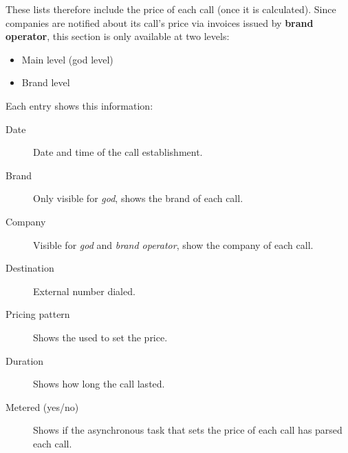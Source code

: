 \documentclass[letterpaper,10pt,english]{sphinxmanual}
\begin{document}
These lists therefore include the price of each call (once it is calculated). Since
companies are notified about its call's price via invoices issued by \textbf{brand operator},
this section is only available at two levels:
\begin{itemize}
\item {} 
Main level (god level)

\item {} 
Brand level

\end{itemize}

Each entry shows this information:
\begin{description}
\item[{Date}] \leavevmode{}\label{billing_and_invoices/billable_calls:term-date}
Date and time of the call establishment.

\item[{Brand}] \leavevmode{}\label{billing_and_invoices/billable_calls:term-brand}
Only visible for \emph{god}, shows the brand of each call.

\item[{Company}] \leavevmode{}\label{billing_and_invoices/billable_calls:term-company}
Visible for \emph{god} and \emph{brand operator}, show the company of each call.

\item[{Destination}] \leavevmode{}\label{billing_and_invoices/billable_calls:term-destination}
External number dialed.

\item[{Pricing pattern}] \leavevmode{}\label{billing_and_invoices/billable_calls:term-pricing-pattern}
Shows the {\hyperref[external_outgoing_calls/noplan_nocall:price\string-pattern]{}} used to set the price.

\item[{Duration}] \leavevmode{}\label{billing_and_invoices/billable_calls:term-duration}
Shows how long the call lasted.

\item[{Metered (yes/no)}] \leavevmode{}\label{billing_and_invoices/billable_calls:term-metered-yes-no}
Shows if the asynchronous task that sets the price of each call has
parsed each call.


\end{description}
\end{document}

